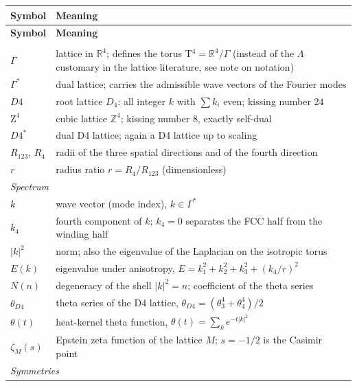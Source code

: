 \documentclass[11pt]{report}
\begin{document}
\begin{center}
\renewcommand{\arraystretch}{1.3}
{\small\setlength\tabcolsep{5pt}
\begin{longtable}{lp{9.6cm}}
\toprule
\textbf{Symbol} & \textbf{Meaning} \\
\midrule
\endfirsthead
\toprule
\textbf{Symbol} & \textbf{Meaning} \\
\midrule
\endhead
\bottomrule
\endfoot
\multicolumn{2}{l}{\textit{Lattice and torus}} \\
$\Gamma$ & lattice in $\mathbb{R}^4$; defines the torus
  T$^4 = \mathbb{R}^4/\Gamma$ (instead of the $\Lambda$ customary
  in the lattice literature, see note on notation) \\
$\Gamma^{*}$ & dual lattice; carries the admissible wave vectors
  of the Fourier modes \\
$D4$ & root lattice $D_4$: all integer $k$ with $\sum k_i$ even;
  kissing number 24 \\
$\text{Z}^4$ & cubic lattice $\mathbb{Z}^4$; kissing number 8,
  exactly self-dual \\
$D4^{*}$ & dual D4 lattice; again a D4 lattice up to scaling \\
$R_{123}$, $R_4$ & radii of the three spatial directions and of the
  fourth direction \\
$r$ & radius ratio $r = R_4/R_{123}$ (dimensionless) \\
\midrule
\multicolumn{2}{l}{\textit{Spectrum}} \\
$k$ & wave vector (mode index), $k \in \Gamma^{*}$ \\
$k_4$ & fourth component of $k$; $k_4 = 0$ separates the FCC half
  from the winding half \\
$|k|^2$ & norm; also the eigenvalue of the Laplacian on the
  isotropic torus \\
$E(k)$ & eigenvalue under anisotropy,
  $E = k_1^2+k_2^2+k_3^2+(k_4/r)^2$ \\
$N(n)$ & degeneracy of the shell $|k|^2 = n$; coefficient of the
  theta series \\
$\theta_{D4}$ & theta series of the D4 lattice,
  $\theta_{D4} = (\theta_3^4+\theta_4^4)/2$ \\
$\theta(t)$ & heat-kernel theta function,
  $\theta(t) = \sum_k e^{-t|k|^2}$ \\
$\zeta_M(s)$ & Epstein zeta function of the lattice $M$;
  $s = -1/2$ is the Casimir point \\
\midrule
\multicolumn{2}{l}{\textit{Symmetries}} \\

\end{longtable}}
\end{center}
\end{document}
